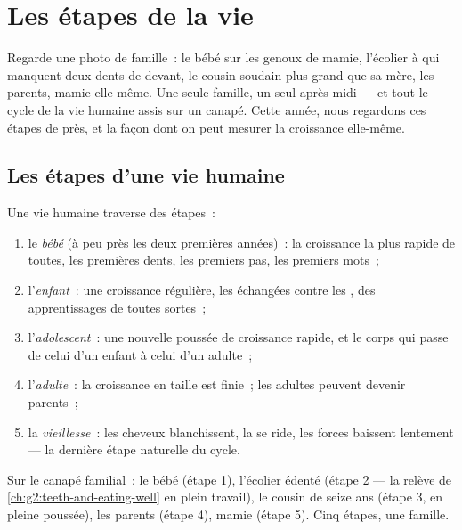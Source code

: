 \chapter{Les étapes de la vie}\label{ch:g3:stages-of-life}

Regarde une photo de famille~: le bébé sur les genoux de mamie,
l'écolier à qui manquent deux dents de devant, le cousin 
soudain plus grand que sa mère, les parents, mamie elle-même. Une
seule famille, un seul après-midi --- et tout le cycle de la vie
humaine assis sur un canapé. Cette année, nous regardons ces étapes
de près, et la façon dont on peut mesurer la croissance elle-même.

\section{Les étapes d'une vie humaine}

\begin{definition}\label{def:g3:stages-of-life:stages}
Une vie humaine traverse des étapes~:
\begin{enumerate}
  \item le \emph{bébé} (à peu près les deux premières
        années)~: la croissance la plus rapide de toutes, les
        premières dents, les premiers pas, les premiers mots~;
  \item l'\emph{enfant}~: une croissance régulière,
        les  échangées contre les , des
        apprentissages de toutes sortes~;
  \item l'\emph{adolescent}~: une nouvelle
        poussée de croissance rapide, et le corps qui passe de
        celui d'un enfant à celui d'un adulte~;
  \item l'\emph{adulte}~: la croissance en taille est
        finie~; les adultes peuvent devenir parents~;
  \item la \emph{vieillesse}~: les cheveux
        blanchissent, la  se ride, les forces baissent
        lentement --- la dernière étape naturelle du cycle.
\end{enumerate}
\end{definition}

\begin{example}\label{ex:g3:stages-of-life:sofa}
Sur le canapé familial~: le bébé (étape 1), l'écolier édenté (étape
2 --- la relève de \cref{ch:g2:teeth-and-eating-well} en plein
travail), le cousin de seize ans (étape 3, en pleine poussée), les
parents (étape 4), mamie (étape 5). Cinq étapes, une famille.
\end{example}

